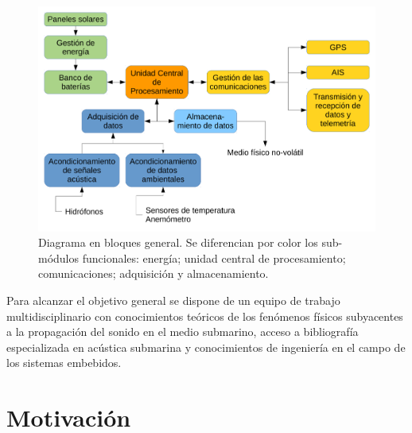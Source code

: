 \begin{figure}[ht]
  \centering
	\includegraphics[width=\textwidth]{./Figures/Diagrama_en_Bloques.pdf}
	\caption[Diagrama en bloques general del sistema.]{Diagrama en bloques general. Se diferencian por color los sub-módulos funcionales: energía; unidad central de procesamiento; comunicaciones; adquisición y almacenamiento.}
	\label{fig:diagramaBloques}
\end{figure}

Para alcanzar el objetivo general se dispone de un equipo de trabajo multidisciplinario con conocimientos teóricos de los fenómenos físicos subyacentes a la propagación del sonido en el medio submarino, acceso a bibliografía especializada en acústica submarina y  conocimientos de ingeniería en el campo de los sistemas embebidos.





\section{Motivación}
\label{motivacion}

